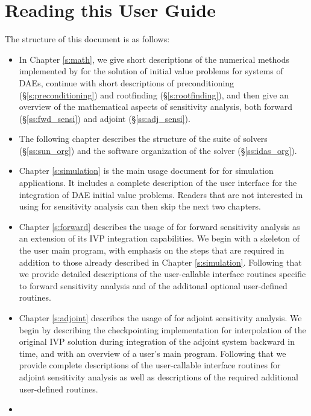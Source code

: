 \section{Reading this User Guide}\label{ss:reading}

The structure of this document is as follows:
\begin{itemize}
\item
  In Chapter \ref{s:math}, we give short descriptions of the numerical
  methods implemented by {\idas} for the solution of initial value problems
  for systems of DAEs, continue with short descriptions of preconditioning
  (\S\ref{s:preconditioning}) and rootfinding (\S\ref{s:rootfinding}), and
  then give an overview of the mathematical aspects of sensitivity analysis,
  both forward (\S\ref{ss:fwd_sensi}) and adjoint (\S\ref{ss:adj_sensi}).
\item
  The following chapter describes the structure of the {\sundials} suite
  of solvers (\S\ref{ss:sun_org}) and the software organization of the {\idas}
  solver (\S\ref{ss:idas_org}).
\item
  Chapter \ref{s:simulation} is the main usage document for {\idas}
  for simulation applications.  It includes a complete description of
  the user interface for the integration of DAE initial value problems.
  Readers that are not interested in using {\idas} for sensitivity
  analysis can then skip the next two chapters.
\item
  Chapter \ref{s:forward} describes the usage of {\idas} for forward
  sensitivity analysis as an extension of its IVP integration
  capabilities.  We begin with a skeleton of the user main program,
  with emphasis on the steps that are required in addition to those
  already described in Chapter \ref{s:simulation}.  Following that we
  provide detailed descriptions of the user-callable interface
  routines specific to forward sensitivity analysis and of the
  additonal optional user-defined routines.
\item
  Chapter \ref{s:adjoint} describes the usage of {\idas} for adjoint
  sensitivity analysis. We begin by describing the {\idas} checkpointing
  implementation for interpolation of the original IVP solution during
  integration of the adjoint system backward in time, and with
  an overview of a user's main program. Following that we provide complete
  descriptions of the user-callable interface routines for adjoint sensitivity
  analysis as well as descriptions of the required additional user-defined routines.
\item

\end{itemize}
